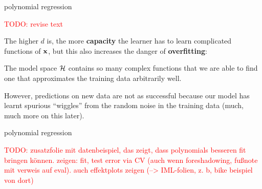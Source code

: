 \documentclass[11pt,compress,t,notes=noshow, xcolor=table]{beamer}
\begin{document}

\begin{vbframe}{polynomial regression}

\textcolor{red}{TODO: revise text}

The higher $d$ is, the more \textbf{capacity} the learner has to learn complicated functions of $\mathbf{x}$, but
this also increases the danger of \textbf{overfitting}:\\
\lz

The model space $\mathcal{H}$ contains so many complex functions that we are able to find one that approximates
the training data arbitrarily well.
\lz

However, predictions on new data are not as successful because our model has learnt spurious \enquote{wiggles} from the random noise in the training data (much, much more on this later).

\end{vbframe}



\begin{frame}{polynomial regression}

\textcolor{red}{TODO: zusatzfolie mit datenbeispiel, das zeigt, dass polynomials 
besseren fit bringen können. zeigen: fit, test error via CV (auch wenn 
foreshadowing, fußnote mit verweis auf eval). auch effektplots zeigen 
(--> IML-folien, z. b, bike beispiel von dort)}

\end{frame}


\endlecture
\end{document}
